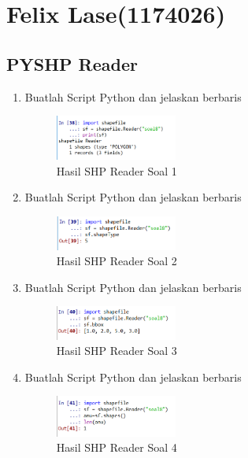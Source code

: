\section{Felix Lase(1174026)}
\subsection{PYSHP Reader}
\begin{enumerate}
    \item Buatlah Script Python dan jelaskan berbaris
    
    \hfill\break
    \begin{figure}[H]
		\includegraphics[width=4cm]{figures/1174026/3/1.png}
		\centering
		\caption{Hasil SHP Reader Soal 1}
    \end{figure}
    
    \item Buatlah Script Python dan jelaskan berbaris
    
    \hfill\break
    \begin{figure}[H]
		\includegraphics[width=4cm]{figures/1174026/3/2.png}
		\centering
		\caption{Hasil SHP Reader Soal 2}
    \end{figure}
    
    \item Buatlah Script Python dan jelaskan berbaris
    
    \hfill\break
    \begin{figure}[H]
		\includegraphics[width=4cm]{figures/1174026/3/3.png}
		\centering
		\caption{Hasil SHP Reader Soal 3}
    \end{figure}
    
    \item Buatlah Script Python dan jelaskan berbaris
    
    \hfill\break
    \begin{figure}[H]
		\includegraphics[width=4cm]{figures/1174026/3/4.png}
		\centering
		\caption{Hasil SHP Reader Soal 4}
    \end{figure}
    

\end{enumerate}
